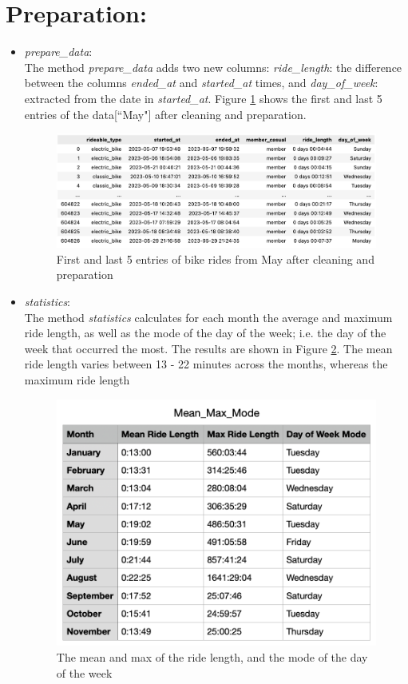 \documentclass[12pt]{article}
\begin{document}
\section*{Preparation:}
\begin{itemize}
\item \textit{prepare\_data}:\\
	The method \textit{prepare\_data} adds two new columns: \textit{ride\_length}: the difference between the columns \textit{ended\_at} and \textit{started\_at} times, and \textit{day\_of\_week}: extracted from the date in \textit{started\_at}. Figure \ref{fig7} shows the first and last 5 entries of the data[``May"] after cleaning and preparation.

	\begin{figure}[h]
	\hspace{1cm}
	\includegraphics[width=5.8 in, height = 1.8 in]{imgMay2.png}
	\caption{First and last 5 entries of bike rides from May after cleaning and preparation}
	\label{fig7}
	\end{figure}
	
\item \textit{statistics}:\\	
	The method \textit{statistics} calculates for each month the average and maximum ride length, as well as the mode of the day of the week; i.e. the day of the week that occurred the most. The results are shown in Figure \ref{fig9}. The mean ride length varies between 13 - 22 minutes across the months, whereas the maximum ride length
	
	\begin{figure}[h]
	\centering
	\includegraphics[width=4 in, height = 3 in]{imgMeanMax.png}
	\caption{The mean and max of the ride length, and the mode of the day of the week}
	\label{fig9}
	\end{figure}
	
\end{itemize}
\end{document}
